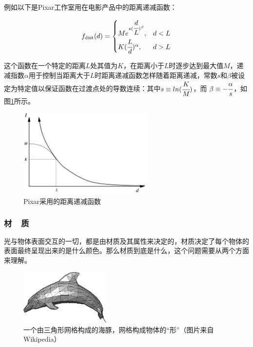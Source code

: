 例如以下是Pixar工作室\cite{a:LightingControlsforComputerCinematography}用在电影产品中的距离递减函数：

\begin{equation}
	f_{\rm dist}(d)=\begin{cases}
		Me^{s( \cfrac{d}{L})^{\beta}}, & d<L\\
		K( \cfrac{L}{d})^{\alpha}, &d>L
	\end{cases}
\end{equation}

\noindent 这个函数在一个特定的距离$L$处其值为$K$，在距离小于$L$时逐步达到最大值$M$，递减指数$\alpha$用于控制当距离大于$L$时距离递减函数怎样随着距离递减，常数$s$和$\beta$被设定为特定值以保证函数在过渡点处的导数连续：其中$s\equiv ln( \cfrac{K}{M})$，而 $\beta\equiv - \cfrac{\alpha}{s}$，如图\ref{f:intro-falloff}所示。

\begin{figure}
\sidecaption
	\includegraphics[width=0.6\textwidth]{figures/intro/falloff}
	\caption{Pixar采用的距离递减函数}
	\label{f:intro-falloff}
\end{figure}






\subsubsection{材~~质}\label{sec:intro-materials}
光与物体表面交互的一切，都是由材质及其属性来决定的，材质决定了每个物体的表面最终呈现出来的是什么颜色。那么材质到底是什么，这个问题需要从两个方面来理解。

\begin{figure}
\sidecaption
	\includegraphics[width=0.4\textwidth]{figures/intro/mesh}
	\caption{一个由三角形网格构成的海豚，网格构成物体的“形”（图片来自Wikipedia）}
	\label{f:intro-mesh}
\end{figure}

